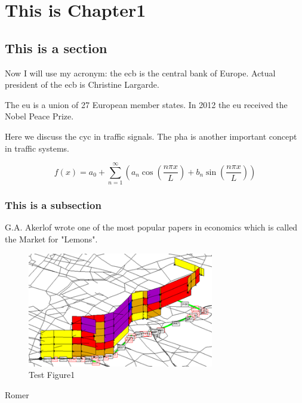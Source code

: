 \chapter{This is Chapter1}

\lipsum[1]%

\section{This is a section}
Now I will use my acronym: the \gls{ecb} is the central bank of Europe. Actual president of the \gls{ecb} is Christine Largarde.

The \gls{eu} is a union of 27 European member states. In 2012 the \gls{eu} received the Nobel Peace Prize.

Here we discuss the \gls{cyc} in traffic signals. The \gls{pha} is another important concept in traffic systems.

\begin{equation}
    f(x) = a_0 + \sum_{n=1}^{\infty} \left( a_n \cos\left(\frac{n\pi x}{L}\right) + b_n \sin\left(\frac{n\pi x}{L}\right) \right) \label{eq:fourier} 
\end{equation}

\subsection{This is a subsection}
G.A. Akerlof wrote one of the most popular papers in economics which is called the Market for "Lemons"\parencite{akerlof1970}.
\begin{figure}[H] %
    \centering
    \includegraphics[height=50mm]{Images/TestPic.png} %
    \caption{Test Figure1} %
    \label{fig:TestFigure1} %
\end{figure} 

Romer \parencite{romer1990endogenous}

